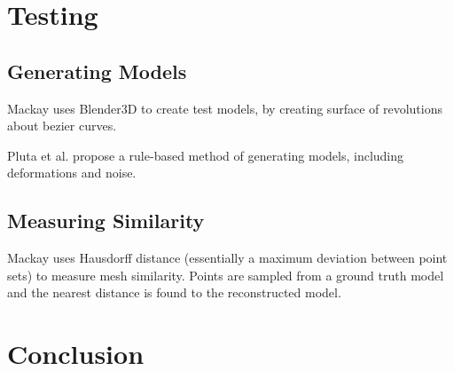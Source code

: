 \documentclass[acmsmall]{acmart}
\begin{document}
\section{Testing}
\subsection{Generating Models}

Mackay \cite{mackay2019robust} uses Blender3D to create test models, by creating surface of revolutions about bezier curves. 

Pluta et al. \cite{pluta2012new} propose a rule-based method of generating models, including deformations and noise.

\subsection{Measuring Similarity}

Mackay \cite{mackay2019robust} uses Hausdorff distance (essentially a maximum deviation between point sets) to measure mesh similarity. Points are sampled from a ground truth model and the nearest distance is found to the reconstructed model.

\section{Conclusion}



\end{document}
